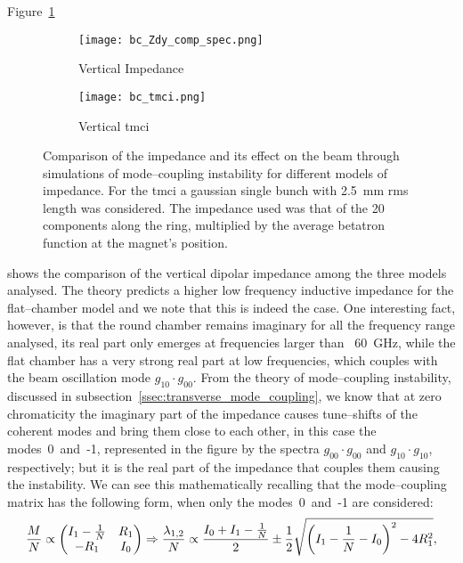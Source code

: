     Figure~\ref{fig:bc_zdy_comp}
    \begin{figure}
        \centering
        \begin{subfigure}[c]{0.48\textwidth}
            \centering
            \texttt{[image: bc\_Zdy\_comp\_spec.png]}
            \caption{Vertical Impedance}
            \label{fig:bc_zdy_comp}
        \end{subfigure}\hfill
        \begin{subfigure}[c]{0.48\textwidth}
            \centering
            \texttt{[image: bc\_tmci.png]}
            \caption{Vertical \gls{tmci}}
            \label{fig:bc_tmci}
        \end{subfigure}
        \caption[Comparison of the vertical dipolar impedance among different models of BC chamber.]{Comparison of the impedance and its effect on the beam through simulations of mode--coupling instability for different models of impedance. For the \gls{tmci} a gaussian single bunch with \SI{2.5}{\milli\meter} \gls{rms} length was considered. The impedance used was that of the 20 components along the ring, multiplied by the average betatron function at the magnet's position.}
        \label{fig:bc_comparisons}
    \end{figure}
     shows the comparison of the vertical dipolar impedance among the three models analysed. The theory predicts a higher low frequency inductive impedance for the flat--chamber model and we note that this is indeed the case. One interesting fact, however, is that the round chamber remains imaginary for all the frequency range analysed, its real part only emerges at frequencies larger than ~\SI{60}{\giga\hertz}, while the flat chamber has a very strong real part at low frequencies, which couples with the beam oscillation mode $g_{10}\cdot g_{00}$. From the theory of mode--coupling instability, discussed in subsection~\ref{ssec:transverse_mode_coupling}, we know that at zero chromaticity the imaginary part of the impedance causes tune--shifts of the coherent modes and bring them close to each other, in this case the modes~0~and~-1, represented in the figure by the spectra $g_{00}\cdot g_{00}$ and $g_{10}\cdot g_{10}$, respectively; but it is the real part of the impedance that couples them causing the instability. We can see this mathematically recalling that the mode--coupling matrix has the following form, when only the modes~0~and~-1 are considered:
     \begin{align}\label{eq:bc_eigen_value}
         \frac{M}{N} \propto
         \begin{pmatrix} I_1 -\frac1N & R_1 \\ -R_1 & I_0 \end{pmatrix}
         \Rightarrow
         \frac{\lambda_{1,2}}{N} \propto \frac{I_0 + I_1 -\frac1N}{2} \pm \frac12\sqrt{\left(I_1-\frac1N - I_0\right)^2 - 4R_1^2},
     \end{align}
